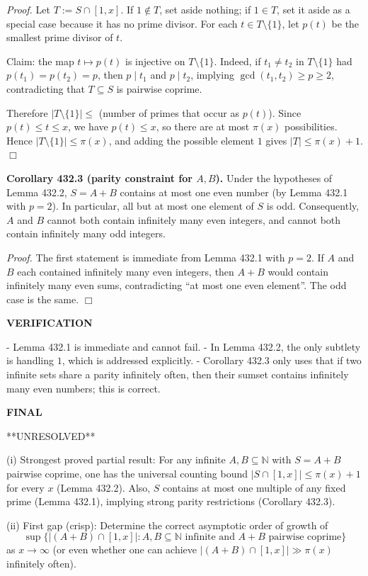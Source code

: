 \noindent\emph{Proof.}
Let $T:=S\cap[1,x]$. If $1\notin T$, set aside nothing; if $1\in T$, set it aside as a special case because it has no prime divisor. For each $t\in T\setminus\{1\}$, let $p(t)$ be the smallest prime divisor of $t$.

Claim: the map $t\mapsto p(t)$ is injective on $T\setminus\{1\}$. Indeed, if $t_1\ne t_2$ in $T\setminus\{1\}$ had $p(t_1)=p(t_2)=p$, then $p\mid t_1$ and $p\mid t_2$, implying $\gcd(t_1,t_2)\ge p\ge 2$, contradicting that $T\subseteq S$ is pairwise coprime.

Therefore $|T\setminus\{1\}|\le$ (number of primes that occur as $p(t)$). Since $p(t)\le t\le x$, we have $p(t)\le x$, so there are at most $\pi(x)$ possibilities. Hence $|T\setminus\{1\}|\le \pi(x)$, and adding the possible element $1$ gives $|T|\le \pi(x)+1$. \hfill$\Box$

\medskip
\noindent\textbf{Corollary 432.3 (parity constraint for $A,B$).}
Under the hypotheses of Lemma 432.2, $S=A+B$ contains at most one even number (by Lemma 432.1 with $p=2$). In particular, all but at most one element of $S$ is odd. Consequently, $A$ and $B$ cannot both contain infinitely many even integers, and cannot both contain infinitely many odd integers.

\noindent\emph{Proof.}
The first statement is immediate from Lemma 432.1 with $p=2$. If $A$ and $B$ each contained infinitely many even integers, then $A+B$ would contain infinitely many even sums, contradicting ``at most one even element''. The odd case is the same. \hfill$\Box$

\medskip
\noindent\textbf{VERIFICATION}

- Lemma 432.1 is immediate and cannot fail.
- In Lemma 432.2, the only subtlety is handling $1$, which is addressed explicitly.
- Corollary 432.3 only uses that if two infinite sets share a parity infinitely often, then their sumset contains infinitely many even numbers; this is correct.

\medskip
\noindent\textbf{FINAL}

**UNRESOLVED**

(i) Strongest proved partial result: For any infinite $A,B\subseteq\mathbb N$ with $S=A+B$ pairwise coprime, one has the universal counting bound $|S\cap[1,x]|\le \pi(x)+1$ for every $x$ (Lemma 432.2). Also, $S$ contains at most one multiple of any fixed prime (Lemma 432.1), implying strong parity restrictions (Corollary 432.3).

(ii) First gap (crisp): Determine the correct asymptotic order of growth of
\[\sup\{|(A+B)\cap[1,x]|: A,B\subseteq\mathbb N\text{ infinite and }A+B\text{ pairwise coprime}\}\]
as $x\to\infty$ (or even whether one can achieve $|(A+B)\cap[1,x]|\gg \pi(x)$ infinitely often).

